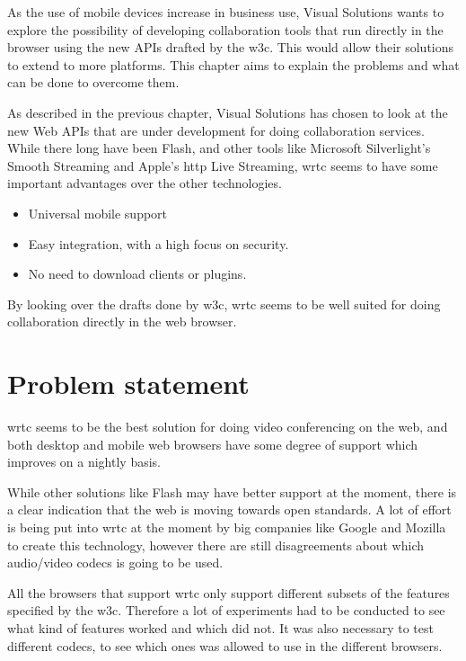 
As the use of mobile devices increase in business use, Visual Solutions wants to explore the possibility of developing collaboration tools that run directly in the browser using the new APIs drafted by the \gls{w3c}. This would allow their solutions to extend to more platforms. This chapter aims to explain the problems and what can be done to overcome them.

As described in the previous chapter, Visual Solutions has chosen to look at the new Web APIs that are under development for doing collaboration services. While there long have been Flash, and other tools like Microsoft Silverlight's Smooth Streaming and Apple's \gls{http} Live Streaming, \gls{wrtc} seems to have some important advantages over the other technologies.

\begin{itemize}
    \item Universal mobile support
    \item Easy integration, with a high focus on security.
    \item No need to download clients or plugins.
\end{itemize}

By looking over the drafts done by \gls{w3c}, \gls{wrtc} seems to be well suited for doing collaboration directly in the web browser.

\section{Problem statement}
\gls{wrtc} seems to be the best solution for doing video conferencing on the web, and both desktop and mobile web browsers have some degree of support which improves on a nightly basis.

While other solutions like Flash may have better support at the moment, there is a clear indication that the web is moving towards open standards\cite{jennings_real-time_2013}. A lot of effort is being put into \gls{wrtc} at the moment by big companies like Google and Mozilla to create this technology, however there are still disagreements about which audio/video codecs is going to be used\cite{philippe_video_2014}.

All the browsers that support \gls{wrtc} only support different subsets of the features specified by the \gls{w3c}. Therefore a lot of experiments had to be conducted to see what kind of features worked and which did not. It was also necessary to test different codecs, to see which ones was allowed to use in the different browsers.

